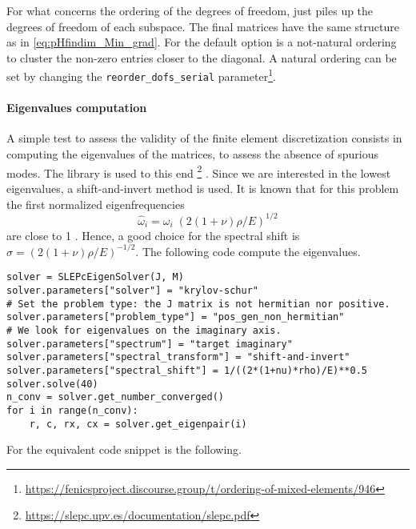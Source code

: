 For what concerns the ordering of the degrees of freedom, \firedrake just piles up the degrees of freedom of each subspace. The final matrices have the same structure as in \eqref{eq:pHfindim_Min_grad}. For \fenics the default option is a not-natural ordering to cluster the non-zero entries closer to the diagonal. A natural ordering can be set by changing the \verb|reorder_dofs_serial| parameter\footnote{\url{https://fenicsproject.discourse.group/t/ordering-of-mixed-elements/946}}.

\paragraph{Eigenvalues computation}
A simple test to assess the validity of the finite element discretization consists in computing the eigenvalues of the matrices, to assess the absence of spurious modes. The {} library is used to this end \footnote{\url{https://slepc.upv.es/documentation/slepc.pdf}} \cite{hernandez2005slepc}. Since we are interested in the lowest eigenvalues, a shift-and-invert method is used. It is known that for this problem the first normalized eigenfrequencies
\[
\widehat{\omega}_i = \omega_i \; (2(1+\nu)\rho/E)^{1/2}
\]
are close to 1 \cite{dawe1980rayleigh}. Hence, a good choice for the spectral shift is $\sigma = (2(1+\nu)\rho/E)^{-1/2}$.  The following code compute the eigenvalues.
\begin{tcolorbox}[title = Eigenvalues computation in  \fenics, coltitle=black, breakable, size=fbox, boxrule=1pt, pad at break*=1mm, colframe=red, enlarge top by=0.25em, enlarge bottom by=0.5em]
\begin{Verbatim}[tabsize=4]
solver = SLEPcEigenSolver(J, M)
solver.parameters["solver"] = "krylov-schur"
# Set the problem type: the J matrix is not hermitian nor positive.
solver.parameters["problem_type"] = "pos_gen_non_hermitian"
# We look for eigenvalues on the imaginary axis.
solver.parameters["spectrum"] = "target imaginary"
solver.parameters["spectral_transform"] = "shift-and-invert"
solver.parameters["spectral_shift"] = 1/((2*(1+nu)*rho)/E)**0.5
solver.solve(40)
n_conv = solver.get_number_converged()
for i in range(n_conv):
	r, c, rx, cx = solver.get_eigenpair(i)
\end{Verbatim}
\end{tcolorbox}
 For \firedrake the equivalent code snippet is the following.
